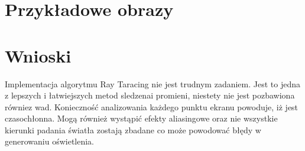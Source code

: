 \documentclass[wide,a4paper,titlepage,12pt] {article}
\begin{document}

\newpage
\section{Przykładowe obrazy}

\newpage
{}

\section{Wnioski}
Implementacja algorytmu Ray Taracing nie jest trudnym zadaniem. Jest to jedna z lepszych i łatwiejszych metod sledzenai promieni, niestety nie jest pozbawiona równiez wad. Konieczność analizowania każdego punktu ekranu powoduje, iż jest czasochłonna.  Mogą również wystąpić efekty aliasingowe oraz nie wszystkie kierunki padania światła zostają zbadane co może powodować błędy w generowaniu oświetlenia.
\end{document}
